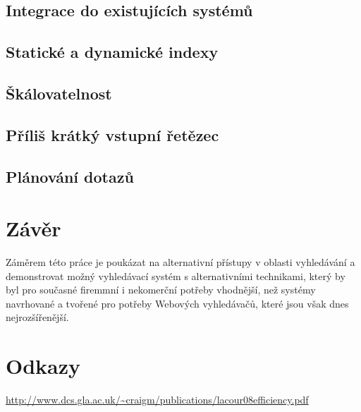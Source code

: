 \documentclass[11pt]{article}
\begin{document}
\subsection{Integrace do existujících systémů}
\subsection{Statické a dynamické indexy}
\subsection{Škálovatelnost}
\subsection{Příliš krátký vstupní řetězec}
\subsection{Plánování dotazů}


\section{Závěr}
Záměrem této práce je poukázat na alternativní přístupy v oblasti vyhledávání a
demonstrovat možný vyhledávací systém s alternativními technikami, který by byl
pro současné firemmní i nekomerční potřeby vhodnější, než systémy navrhované a
tvořené pro potřeby Webových vyhledávačů, které jsou však dnes nejrozšířenější.

\section{Odkazy}
\url{http://www.dcs.gla.ac.uk/~craigm/publications/lacour08efficiency.pdf}
\end{document}
